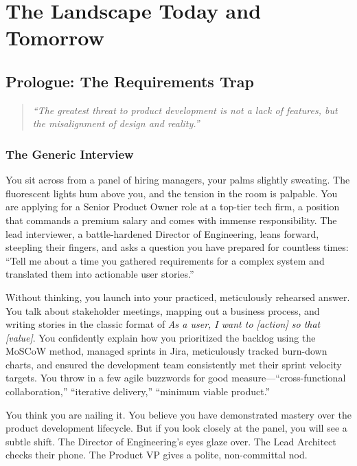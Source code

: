 \part{The Landscape Today and Tomorrow}

\chapter*{Prologue: The Requirements
Trap}\label{prologue-the-requirements-trap}

\begin{quote}
\emph{``The greatest threat to product development is not a lack of
features, but the misalignment of design and reality.''}
\end{quote}

\section{The Generic Interview}\label{the-generic-interview}

You sit across from a panel of hiring managers, your palms slightly
sweating. The fluorescent lights hum above you, and the tension in the
room is palpable. You are applying for a Senior Product Owner role at a
top-tier tech firm, a position that commands a premium salary and comes
with immense responsibility. The lead interviewer, a battle-hardened
Director of Engineering, leans forward, steepling their fingers, and
asks a question you have prepared for countless times: ``Tell me about a
time you gathered requirements for a complex system and translated them
into actionable user stories.''

Without thinking, you launch into your practiced, meticulously rehearsed
answer. You talk about stakeholder meetings, mapping out a business
process, and writing stories in the classic format of \emph{As a user, I
want to {[}action{]} so that {[}value{]}}. You confidently explain how
you prioritized the backlog using the MoSCoW method, managed sprints in
Jira, meticulously tracked burn-down charts, and ensured the development
team consistently met their sprint velocity targets. You throw in a few
agile buzzwords for good measure---``cross-functional collaboration,''
``iterative delivery,'' ``minimum viable product.''

You think you are nailing it. You believe you have demonstrated mastery
over the product development lifecycle. But if you look closely at the
panel, you will see a subtle shift. The Director of Engineering's eyes
glaze over. The Lead Architect checks their phone. The Product VP gives
a polite, non-committal nod.

